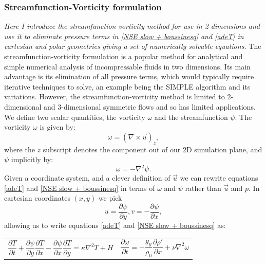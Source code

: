 \documentclass{article}
\begin{document}
\subsubsection*{Streamfunction-Vorticity formulation}
{\it{Here I introduce the streamfunction-vorticity method for use in 2 dimensions and use it to eliminate pressure terms in \ref{NSE slow + boussinesq} and \ref{adeT} in cartesian and polar geometries giving a set of numerically solvable equations.}}
\vspace{0.3cm}
\newline
\noindent The streamfunction-vorticity formulation is a popular method for analytical and simple numerical analysis of incompressable fluids in two dimensions. Its main advantage is its elimination of all pressure terms, which would typically require iterative techniques to solve, an example being the SIMPLE algorithm and its variations. However, the streamfunction-vorticity method is limited to 2-dimensional and 3-dimensional symmetric flows and so has limited applications.
\newline
\noindent We define two scalar quantities, the vorticity $\omega$ and the streamfunction $\psi$. The vorticity $\omega$ is given by:
\begin{equation}
	\omega = (\nabla \times \vec{u})_z,
	\label{omega}
\end{equation}
where the $z$ subscript denotes the component out of our 2D simulation plane, and $\psi$ implicitly by:
\begin{equation}
	\omega = - \nabla^2 \psi.
	\label{psi}
\end{equation}
Given a coordinate system, and a clever definition of $\vec{u}$ we can rewrite equations \ref{adeT} and \ref{NSE slow + boussinesq} in terms of $\omega$ and $\psi$ rather than $\vec{u}$ and $p$. In cartesian coordinates $(x,y)$ we pick 
\begin{equation}
	u = \frac{\partial \psi}{\partial y}, v = -\frac{\partial \psi}{\partial x},
	\label{cartesian velocities}
\end{equation}
allowing us to write equations \ref{adeT} and \ref{NSE slow + boussinesq} as:
\begin{tabularx}{\textwidth}{XX}
\begin{equation}
	\frac{\partial T}{\partial t} + \frac{\partial \psi}{\partial y} \frac{\partial T}{\partial x} - \frac{\partial \psi}{\partial x} \frac{\partial T}{\partial y} = \kappa \nabla^2 T + H
	\label{adeT sfvt cartesian}
\end{equation}
    &
\begin{equation}
	\frac{\partial \omega}{\partial t} = -\frac{g_y}{\rho_0} \frac{\partial \rho'}{\partial x} + \nu \nabla^2 \omega
	\label{NSE slow + boussinesq sfvt cartesian}
\end{equation}
\end{tabularx}\par
\end{document}
